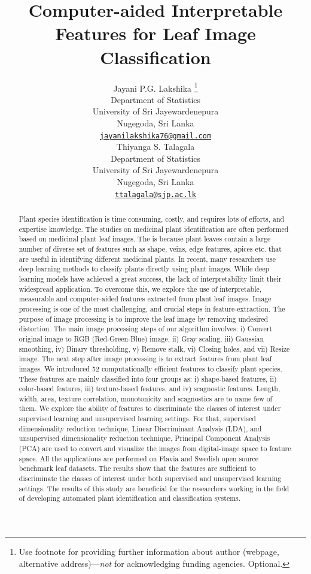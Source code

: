 \documentclass{article}
\title{Computer-aided Interpretable Features for Leaf Image
Classification}
\author{
    Jayani P.G. Lakshika
    \thanks{Use footnote for providing further information about author
(webpage, alternative address)---\emph{not} for acknowledging funding
agencies. Optional.}
   \\
    Department of Statistics \\
    University of Sri Jayewardenepura \\
  Nugegoda, Sri Lanka \\
  \texttt{\href{mailto:jayanilakshika76@gmail.com}{\nolinkurl{jayanilakshika76@gmail.com}}} \\
   \And
    Thiyanga S. Talagala
   \\
    Department of Statistics \\
    University of Sri Jayewardenepura \\
  Nugegoda, Sri Lanka \\
  \texttt{\href{mailto:ttalagala@sjp.ac.lk}{\nolinkurl{ttalagala@sjp.ac.lk}}} \\
  }
\begin{document}
\maketitle

\def\tightlist{}


\begin{abstract}
Plant species identification is time consuming, costly, and requires
lots of efforts, and expertise knowledge. The studies on medicinal plant
identification are often performed based on medicinal plant leaf images.
The is because plant leaves contain a large number of diverse set of
features such as shape, veins, edge features, apices etc. that are
useful in identifying different medicinal plants. In recent, many
researchers use deep learning methods to classify plants directly using
plant images. While deep learning models have achieved a great success,
the lack of interpretability limit their widespread application. To
overcome this, we explore the use of interpretable, measurable and
computer-aided features extracted from plant leaf images. Image
processing is one of the most challenging, and crucial steps in
feature-extraction. The purpose of image processing is to improve the
leaf image by removing undesired distortion. The main image processing
steps of our algorithm involves: i) Convert original image to RGB
(Red-Green-Blue) image, ii) Gray scaling, iii) Gaussian smoothing, iv)
Binary thresholding, v) Remove stalk, vi) Closing holes, and vii) Resize
image. The next step after image processing is to extract features from
plant leaf images. We introduced 52 computationally efficient features
to classify plant species. These features are mainly classified into
four groups as: i) shape-based features, ii) color-based features, iii)
texture-based features, and iv) scagnostic features. Length, width,
area, texture correlation, monotonicity and scagnostics are to name few
of them. We explore the ability of features to discriminate the classes
of interest under supervised learning and unsupervised learning
settings. For that, supervised dimensionality reduction technique,
Linear Discriminant Analysis (LDA), and unsupervised dimensionality
reduction technique, Principal Component Analysis (PCA) are used to
convert and visualize the images from digital-image space to feature
space. All the applications are performed on Flavia and Swedish open
source benchmark leaf datasets. The results show that the features are
sufficient to discriminate the classes of interest under both supervised
and unsupervised learning settings. The results of this study are
beneficial for the researchers working in the field of developing
automated plant identification and classification systems.
\end{abstract}
\end{document}
